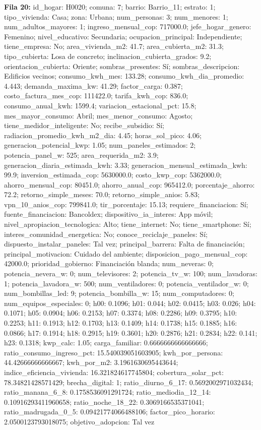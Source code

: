 {\footnotesize\textbf{Fila 20:} id\_hogar: H0020; comuna: 7; barrio: Barrio\_11; estrato: 1; tipo\_vivienda: Casa; zona: Urbana; num\_personas: 3; num\_menores: 1; num\_adultos\_mayores: 1; ingreso\_mensual\_cop: 717000.0; jefe\_hogar\_genero: Femenino; nivel\_educativo: Secundaria; ocupacion\_principal: Independiente; tiene\_empresa: No; area\_vivienda\_m2: 41.7; area\_cubierta\_m2: 31.3; tipo\_cubierta: Losa de concreto; inclinacion\_cubierta\_grados: 9.2; orientacion\_cubierta: Oriente; sombras\_presentes: Sí; sombras\_descripcion: Edificios vecinos; consumo\_kwh\_mes: 133.28; consumo\_kwh\_dia\_promedio: 4.443; demanda\_maxima\_kw: 41.29; factor\_carga: 0.387; costo\_factura\_mes\_cop: 111422.0; tarifa\_kwh\_cop: 836.0; consumo\_anual\_kwh: 1599.4; variacion\_estacional\_pct: 15.8; mes\_mayor\_consumo: Abril; mes\_menor\_consumo: Agosto; tiene\_medidor\_inteligente: No; recibe\_subsidio: Sí; radiacion\_promedio\_kwh\_m2\_dia: 4.45; horas\_sol\_pico: 4.06; generacion\_potencial\_kwp: 1.05; num\_paneles\_estimados: 2; potencia\_panel\_w: 525; area\_requerida\_m2: 3.9; generacion\_diaria\_estimada\_kwh: 3.33; generacion\_mensual\_estimada\_kwh: 99.9; inversion\_estimada\_cop: 5630000.0; costo\_kwp\_cop: 5362000.0; ahorro\_mensual\_cop: 80451.0; ahorro\_anual\_cop: 965412.0; porcentaje\_ahorro: 72.2; retorno\_simple\_meses: 70.0; retorno\_simple\_anios: 5.83; vpn\_10\_anios\_cop: 799841.0; tir\_porcentaje: 15.13; requiere\_financiacion: Sí; fuente\_financiacion: Bancoldex; dispositivo\_ia\_interes: App móvil; nivel\_apropiacion\_tecnologica: Alto; tiene\_internet: No; tiene\_smartphone: Sí; interes\_comunidad\_energetica: No; conoce\_reciclaje\_paneles: Sí; dispuesto\_instalar\_paneles: Tal vez; principal\_barrera: Falta de financiación; principal\_motivacion: Cuidado del ambiente; disposicion\_pago\_mensual\_cop: 42000.0; prioridad\_gobierno: Financiación blanda; num\_neveras: 0; potencia\_nevera\_w: 0; num\_televisores: 2; potencia\_tv\_w: 100; num\_lavadoras: 1; potencia\_lavadora\_w: 500; num\_ventiladores: 0; potencia\_ventilador\_w: 0; num\_bombillas\_led: 9; potencia\_bombilla\_w: 15; num\_computadores: 0; num\_equipos\_especiales: 0; h00: 0.1096; h01: 0.044; h02: 0.0415; h03: 0.026; h04: 0.1071; h05: 0.0904; h06: 0.2153; h07: 0.3374; h08: 0.2286; h09: 0.3795; h10: 0.2253; h11: 0.1913; h12: 0.1703; h13: 0.1409; h14: 0.1738; h15: 0.1885; h16: 0.0866; h17: 0.1914; h18: 0.2915; h19: 0.3601; h20: 0.2876; h21: 0.2834; h22: 0.141; h23: 0.1318; kwp\_calc: 1.05; carga\_familiar: 0.6666666666666666; ratio\_consumo\_ingreso\_pct: 15.540039051603905; kwh\_por\_persona: 44.42666666666667; kwh\_por\_m2: 3.1961630695443644; indice\_eficiencia\_vivienda: 16.321824617745804; cobertura\_solar\_pct: 78.34821428571429; brecha\_digital: 1; ratio\_diurno\_6\_17: 0.5692002971032434; ratio\_manana\_6\_8: 0.1758536091291724; ratio\_mediodia\_12\_14: 0.10916293411960658; ratio\_noche\_18\_22: 0.3069166535371041; ratio\_madrugada\_0\_5: 0.09421774066488106; factor\_pico\_horario: 2.0500123793018075; objetivo\_adopcion: Tal vez\par}
